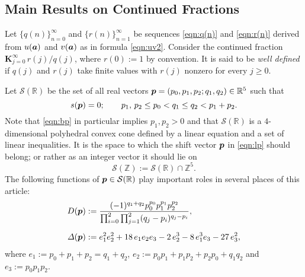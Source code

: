 \documentclass[a4paper,12pt]{article}
\theoremstyle{plain}
\def\R{\mathbb{R}}
\def\Z{\mathbb{Z}}
\def\cS{\mathcal{S}}
\def\vD{\varDelta}
\def\ba{\mbox{\boldmath $a$}}
\def\bp{\mbox{\boldmath $p$}}
\begin{document}
\subsection{Main Results on Continued Fractions}  \label{subsec:mrcf}
Let $\{ q(n)\}_{n=0}^{\infty}$ and $\{r(n)\}_{n=1}^{\infty}$ be sequences 
\eqref{eqn:q(n)} and \eqref{eqn:r(n)} derived from $u(\ba)$ and $v(\ba)$ 
as in formula \eqref{eqn:uv2}. 
Consider the continued fraction $\mathbf{K}_{j=0}^{\infty} \, r(j)/q(j)$, where 
$r(0) := 1$ by convention.  
It is said to be {\sl well defined} if $q(j)$ and $r(j)$ take finite values with 
$r(j)$ nonzero for every $j \ge 0$.   
\par
Let $\cS(\R)$ be the set of all real vectors 
$\bp = (p_0, p_1, p_2; q_1, q_2) \in \R^5$ such that 
\begin{equation} \label{eqn:bp}
s(\bp) = 0; \qquad p_1, \, p_2 \le p_0 < q_1 \le q_2 < p_1 + p_2. 
\end{equation}  
Note that \eqref{eqn:bp} in particular implies $p_1, p_2 > 0$ and that $\cS(\R)$ 
is a $4$-dimensional polyhedral convex cone defined by a linear equation and a 
set of linear inequalities. 
It is the space to which the shift vector $\bp$ in \eqref{eqn:lp} should 
belong; or rather as an integer vector it should lie on   
\begin{equation} \label{eqn:cS(Z)} 
\cS(\Z) := \cS(\R) \cap \Z^5. 
\end{equation}
The following functions of $\bp \in \cS(\R)$ play important 
roles in several places of this article:     
\begin{align}  
D(\bp) &:= \dfrac{(-1)^{q_1+q_2} p_0^{p_0} p_1^{p_1} p_2^{p_2}}{\prod_{i=0}^2 
\prod_{j=1}^2 (q_j - p_i)^{q_j - p_i}},   \label{eqn:A(p)}  \\[2mm] 
\vD(\bp) &:= e_1^2 e_2^2 + 18 \, e_1 e_2 e_3  
- 2 \, e_2^3 - 8 \, e_1^3 e_3 - 27 \, e_3^2,     
\label{eqn:v(p)} 
\end{align}   
where $e_1 := p_0+p_1+p_2 = q_1+q_2$,  
$e_2 := p_0 p_1 + p_1 p_2 + p_2 p_0 + q_1 q_2$ and $e_3 := p_0 p_1 p_2$. 
\end{document}
